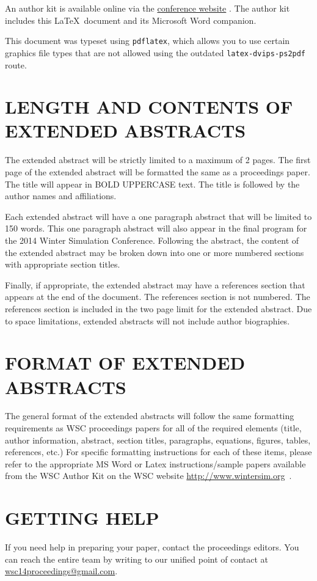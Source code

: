 \documentclass{wscposterproc}
\begin{document}
An author kit is available online via the  \href{http://www.wintersim.org}%
{conference website} \cite{WSC}.
The author kit includes this \LaTeX\ document and its Microsoft Word companion.

This document was typeset using {\tt pdflatex}, which allows you to use certain
graphics file types that are not allowed using the outdated {\tt latex-dvips-ps2pdf} route.

\section{LENGTH AND CONTENTS OF EXTENDED ABSTRACTS}
The extended abstract will be strictly limited to a maximum  of 2 pages. The first page of the extended abstract will be formatted the same as a proceedings paper. The title will appear in BOLD UPPERCASE text. The title is followed by the author names and affiliations.

Each extended abstract will have a one paragraph abstract that will be limited to 150 words. This one paragraph abstract will also appear in the final program for the 2014 Winter Simulation Conference. Following the abstract, the content of the extended abstract may be broken down into one or more numbered sections with appropriate section titles.

Finally, if appropriate, the extended abstract may have a references section that appears at the end of the document. The references section is not numbered. The references section is included in the two page limit for the extended abstract. Due to space limitations, extended abstracts will not include author biographies.

\section{FORMAT OF EXTENDED ABSTRACTS}

The general format of the extended abstracts will follow the same formatting requirements as WSC proceedings papers for all of the required elements (title, author information, abstract, section titles, paragraphs, equations, figures, tables, references, etc.) For specific formatting instructions for each of these items, please refer to the appropriate MS Word or Latex instructions/sample papers available from the WSC Author Kit on the WSC website \url{http://www.wintersim.org}~\cite{WSC}.

\section{GETTING HELP}
If you need help in preparing your paper, contact the proceedings editors. You can reach the entire team by writing to our unified point of contact at \href{mailto://wsc14proceedings@gmail.com}{wsc14proceedings@gmail.com}.
\end{document}

